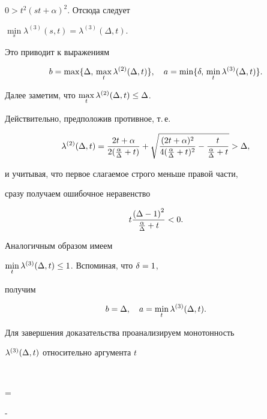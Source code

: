 \begin{pf}
$0 > t^2(st+\alpha )^2$. Отсюда следует


$\min\limits_s \lambda^{(3)}(s,t)= \lambda^{(3)}(\Delta ,t)$.


Это приводит к выражениям


$$


b = \max \{ \Delta, \, \max\limits_{t} \lambda^{(2)}(\zD,t) \} , \quad


a = \min \{ \delta, \, \min\limits_{t} \lambda^{(3)}(\zD,t) \} .


$$





Далее заметим, что $\max\limits_{t} \lambda^{(2)}(\Delta,t) \leq \Delta$.


Действительно, предположив противное, т.\,е.


$$


\lambda^{(2)}(\zD,t) = \frac{2t+\alpha}{2(\frac{\alpha}{\Delta}+t)}+


\sqrt{\frac{(2t+\alpha)^2}{4(\frac{\alpha}{\Delta}+t)^2}-


\frac{t}{\frac{\alpha}{\Delta}+t} } > \zD ,


$$


и учитывая, что первое слагаемое строго меньше правой части,


сразу получаем ошибочное неравенство


$$


t \dfrac{ {(\zD-1)}^2 }{\frac{\za}{\zD}+t} < 0.


$$


Аналогичным образом имеем


$\min\limits_{t} \lambda^{(3)}(\Delta,t) \leq 1$. Вспоминая, что $\delta = 1$,


получим


$$


b = \Delta , \quad


a = \min\limits_{t} \lambda^{(3)}(\zD,t) .


$$





Для завершения доказательства проанализируем монотонность


$\lambda^{(3)}(\Delta,t)$ относительно аргумента $t$


$$


 =


 - 





\end{pf}
